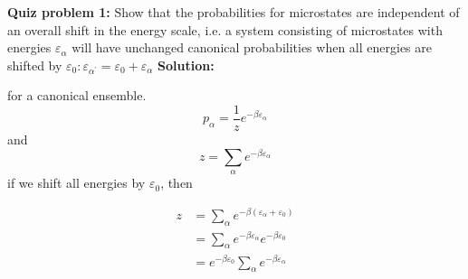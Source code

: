 \documentclass[10pt]{article}
\newenvironment{Solution}
    {\textbf{Solution:}
    
    \vspace{5mm}
    \begin{tcolorbox}
    }
    {
    \end{tcolorbox}
    \vspace{5mm}
    }
\begin{document}
\noindent\textbf{Quiz problem 1:} Show that the probabilities for microstates are independent of an overall shift in the energy scale, i.e. a system consisting of microstates with energies $\varepsilon_{\alpha}$ will have unchanged canonical probabilities when all energies are shifted by $\varepsilon_{0}: \varepsilon_{\alpha^{\prime}}=\varepsilon_{0}+\varepsilon_{\alpha}$
\begin{Solution}
for a canonical ensemble.
\begin{equation}
    p_\alpha = \frac{1}{z}e^{-\beta \varepsilon_\alpha}
\end{equation}
and 
\begin{equation}
    z = \sum_\alpha e^{-\beta \varepsilon_\alpha}
\end{equation}
if we shift all energies by $\varepsilon_{0}$, then

\begin{align}
    z &= \sum_\alpha e^{-\beta\left( \varepsilon_\alpha+\varepsilon_{0}\right)}\\
    &= \sum_\alpha e^{-\beta \varepsilon_\alpha}e^{-\beta \varepsilon_0}\\
    &= e^{-\beta \varepsilon_0}\sum_\alpha e^{-\beta \varepsilon_\alpha}
\end{align}


\end{Solution}
\end{document}
